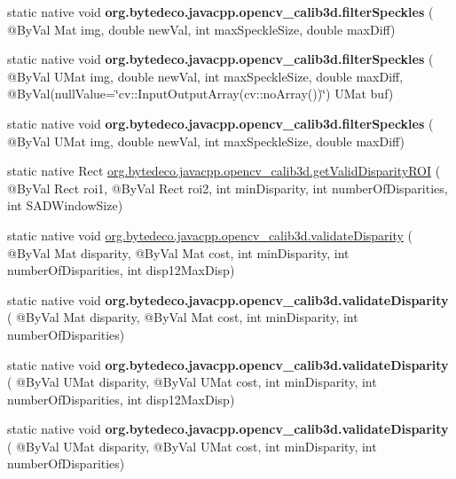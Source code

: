 \begin{DoxyCompactItemize}
static native void {\bfseries org.\+bytedeco.\+javacpp.\+opencv\+\_\+calib3d.\+filter\+Speckles} ( @By\+Val Mat img, double new\+Val, int max\+Speckle\+Size, double max\+Diff)
\item 
\mbox{\label{group__calib3d_ga3e32a14722106650c4d6a076b7e9c492}} 
static native void {\bfseries org.\+bytedeco.\+javacpp.\+opencv\+\_\+calib3d.\+filter\+Speckles} ( @By\+Val U\+Mat img, double new\+Val, int max\+Speckle\+Size, double max\+Diff, @By\+Val(null\+Value=\char`\"{}cv\+::\+Input\+Output\+Array(cv\+::no\+Array())\char`\"{}) U\+Mat buf)
\item 
\mbox{\label{group__calib3d_ga0519367b64c0bb5724da96788555b169}} 
static native void {\bfseries org.\+bytedeco.\+javacpp.\+opencv\+\_\+calib3d.\+filter\+Speckles} ( @By\+Val U\+Mat img, double new\+Val, int max\+Speckle\+Size, double max\+Diff)
\item 
static native Rect \hyperlink{group__calib3d_ga9ebc646662642a921e82a8eb83151c7b}{org.\+bytedeco.\+javacpp.\+opencv\+\_\+calib3d.\+get\+Valid\+Disparity\+R\+OI} ( @By\+Val Rect roi1, @By\+Val Rect roi2, int min\+Disparity, int number\+Of\+Disparities, int S\+A\+D\+Window\+Size)
\item 
static native void \hyperlink{group__calib3d_ga15aa38f118664fcfaccd489f47e33f0d}{org.\+bytedeco.\+javacpp.\+opencv\+\_\+calib3d.\+validate\+Disparity} ( @By\+Val Mat disparity, @By\+Val Mat cost, int min\+Disparity, int number\+Of\+Disparities, int disp12\+Max\+Disp)
\item 
\mbox{\label{group__calib3d_gaafb46c46a91d38424097c4d29723243b}} 
static native void {\bfseries org.\+bytedeco.\+javacpp.\+opencv\+\_\+calib3d.\+validate\+Disparity} ( @By\+Val Mat disparity, @By\+Val Mat cost, int min\+Disparity, int number\+Of\+Disparities)
\item 
\mbox{\label{group__calib3d_ga0155a8c54e737a5dc81203aea732bc4e}} 
static native void {\bfseries org.\+bytedeco.\+javacpp.\+opencv\+\_\+calib3d.\+validate\+Disparity} ( @By\+Val U\+Mat disparity, @By\+Val U\+Mat cost, int min\+Disparity, int number\+Of\+Disparities, int disp12\+Max\+Disp)
\item 
\mbox{\label{group__calib3d_gab091f760832ddb9106fbb405c56a2954}} 
static native void {\bfseries org.\+bytedeco.\+javacpp.\+opencv\+\_\+calib3d.\+validate\+Disparity} ( @By\+Val U\+Mat disparity, @By\+Val U\+Mat cost, int min\+Disparity, int number\+Of\+Disparities)

\end{DoxyCompactItemize}
